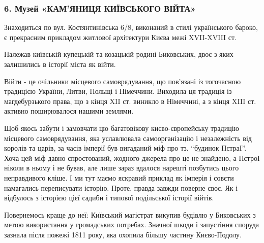  
 
 
 
 
\subsubsection{6. Музей «КАМ’ЯНИЦЯ КИЇВСЬКОГО ВІЙТА»}

Знаходиться по вул. Костянтинівська 6/8, виконаний в стилі українського бароко,
є прекрасним прикладом житлової архітектури Києва межі XVII-XVIII ст.

Належав київській купецькій та козацькій родині Биковських, двоє з яких
залишились в історії міста як війти. 


Війти - це очільники місцевого самоврядування, що пов’язані із тогочасною
традицією України, Литви, Польщі і Німеччини. Виходила ця традиція із
магдебурзького права, що з кінця XII ст. виникло в Німеччині, а з кінця XIII
ст. активно поширювалося нашими землями.


Щоб якось забути і замовчати цю багатовікову києво-європейську традицію
місцевого самоврядування, яка уславлювала самоорганізацію і незалежність від
королів та царів, за часів імперії був вигаданий міф про тз. “будинок ПєтраІ”.
Хоча цей міф давно спростований, жодного джерела про це не знайдено, а ПєтроІ
ніколи в ньому і не бував, але лише зараз вдалося нарешті позбутись цього
неправдивого кліше. І ми тут маємо яскравий приклад як імперія і совєти
намагались переписувати історію. Проте, правда завжди поверне своє. Як і
відбулось з історією цієї садиби і типової подільської історії війтів. 


Повернемось краще до неї: Київський магістрат викупив будівлю у Биковських з
метою використання у громадських потребах. Значної шкоди і запустіння споруда
зазнала після пожежі 1811 року, яка охопила більшу частину Києво-Подолу.  

